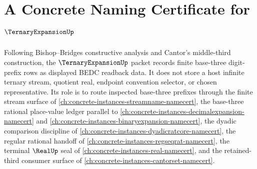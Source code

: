 \chapter{A Concrete Naming Certificate for $\TernaryExpansionUp$}
\label{ch:concrete-instances-ternary-expansion-namecert}

Following Bishop--Bridges constructive analysis and Cantor's middle-third construction, the $\TernaryExpansionUp$ packet records finite base-three digit-prefix rows as displayed BEDC readback data. It does not store a host infinite ternary stream, quotient real, endpoint convention selector, or chosen representative. Its role is to route inspected base-three prefixes through the finite stream surface of \autoref{ch:concrete-instances-streamname-namecert}, the base-three rational place-value ledger parallel to \autoref{ch:concrete-instances-decimalexpansion-namecert} and \autoref{ch:concrete-instances-binaryexpansion-namecert}, the dyadic comparison discipline of \autoref{ch:concrete-instances-dyadicratcore-namecert}, the regular rational handoff of \autoref{ch:concrete-instances-regseqrat-namecert}, the terminal $\RealUp$ seal of \autoref{ch:concrete-instances-real-namecert}, and the retained-third consumer surface of \autoref{ch:concrete-instances-cantorset-namecert}.

